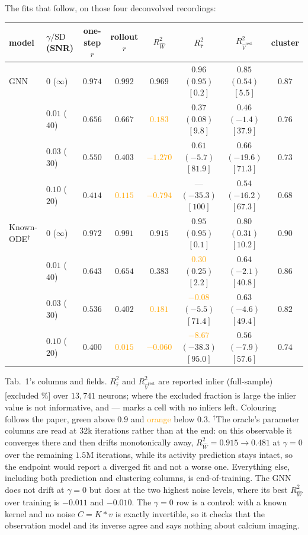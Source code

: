 \documentclass[11pt]{article}
\newcommand{\Rw}{R^2_{\widehat W}}
\newcommand{\Rt}{R^2_{\hat\tau}}
\newcommand{\Rv}{R^2_{\hat V^{\mathrm{rest}}}}
\newcommand{\good}[1]{\textcolor{green!50!black}{#1}}
\newcommand{\bad}[1]{\textcolor{orange}{#1}}
\begin{document}
The fits that follow, on those four deconvolved recordings:
\label{link5}
\begin{center}
{\scriptsize
\setlength{\tabcolsep}{3.5pt}
\begin{tabular}{ll cc c cc c}
\toprule
model & $\gamma/\mathrm{SD}$ (SNR) & one-step $r$ & rollout $r$ & $\Rw$ & $\Rt$ & $\Rv$ & cluster \\
\midrule
GNN       & $0$ ($\infty$)  & \good{$0.974$} & \good{$0.992$} & \good{$0.969$} & \good{$0.96$} $(0.95)$ $[0.2]$ & $0.85$ $(0.54)$ $[5.5]$ & $0.87$ \\
          & $0.01$ ($40$)   & $0.656$ & $0.667$ & \bad{$0.183$}  & $0.37$ $(0.08)$ $[9.8]$          & $0.46$ $(-1.4)$ $[37.9]$  & $0.76$ \\
          & $0.03$ ($30$)   & $0.550$ & $0.403$ & \bad{$-1.270$} & $0.61$ $(-5.7)$ $[81.9]$         & $0.66$ $(-19.6)$ $[71.3]$ & $0.73$ \\
          & $0.10$ ($20$)   & $0.414$ & \bad{$0.115$} & \bad{$-0.794$} & \textcolor{gray}{---} $(-35.3)$ $[100]$ & $0.54$ $(-16.2)$ $[67.3]$ & $0.68$ \\
\midrule
Known-ODE$^{\dagger}$ & $0$ ($\infty$)  & \good{$0.972$} & \good{$0.991$} & \good{$0.915$} & \good{$0.95$} $(0.95)$ $[0.1]$ & $0.80$ $(0.31)$ $[10.2]$ & $0.90$ \\
          & $0.01$ ($40$)   & $0.643$ & $0.654$ & $0.383$        & \bad{$0.30$} $(0.25)$ $[2.2]$   & $0.64$ $(-2.1)$ $[40.8]$  & $0.86$ \\
          & $0.03$ ($30$)   & $0.536$ & $0.402$ & \bad{$0.181$}  & \bad{$-0.08$} $(-5.5)$ $[71.4]$ & $0.63$ $(-4.6)$ $[49.4]$  & $0.82$ \\
          & $0.10$ ($20$)   & $0.400$ & \bad{$0.015$} & \bad{$-0.060$} & \bad{$-8.67$} $(-38.3)$ $[95.0]$ & $0.56$ $(-7.9)$ $[57.6]$ & $0.74$ \\
\bottomrule
\end{tabular}}

{\footnotesize Tab.~1's columns and fields. $\Rt$ and $\Rv$ are reported inlier
(full-sample) [excluded \%] over $13{,}741$ neurons; where the excluded fraction
is large the inlier value is not informative, and \textcolor{gray}{---} marks a
cell with no inliers left. Colouring follows the paper, \good{green} above $0.9$
and \bad{orange} below $0.3$. $^{\dagger}$The oracle's parameter columns are read
at $32$k iterations rather than at the end: on this observable it converges there
and then drifts monotonically away, $\Rw = 0.915 \to 0.481$ at $\gamma = 0$ over
the remaining $1.5$M iterations, while its activity prediction stays intact, so
the endpoint would report a diverged fit and not a worse one. Everything else,
including both prediction and clustering columns, is end-of-training. The GNN
does not drift at $\gamma = 0$ but does at the two highest noise levels, where
its best $\Rw$ over training is $-0.011$ and $-0.010$. The $\gamma = 0$ row is a
control: with a known kernel and no noise $C = K * v$ is exactly invertible, so
it checks that the observation model and its inverse agree and says nothing about
calcium imaging.}
\end{center}
\end{document}
